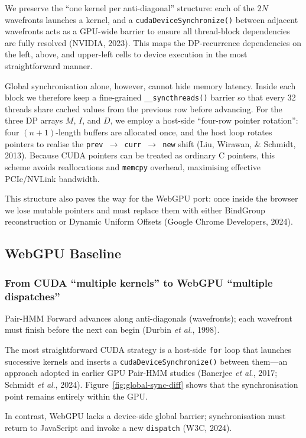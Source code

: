 \documentclass[PhD]{PHlab-thesis}
\begin{document}
We preserve the “one kernel per anti-diagonal” structure: each of the $2N$ wavefronts launches a kernel, and a \texttt{cudaDeviceSynchronize()} between adjacent wavefronts acts as a GPU-wide barrier to ensure all thread-block dependencies are fully resolved (NVIDIA, 2023). This maps the DP-recurrence dependencies on the left, above, and upper-left cells to device execution in the most straightforward manner.

Global synchronisation alone, however, cannot hide memory latency. Inside each block we therefore keep a fine-grained \texttt{\_\_syncthreads()} barrier so that every 32 threads share cached values from the previous row before advancing. For the three DP arrays $M$, $I$, and $D$, we employ a host-side “four-row pointer rotation”: four $(n\!+\!1)$-length buffers are allocated once, and the host loop rotates pointers to realise the \texttt{prev $\rightarrow$ curr $\rightarrow$ new} shift (Liu, Wirawan, \& Schmidt, 2013). Because CUDA pointers can be treated as ordinary C pointers, this scheme avoids reallocations and \texttt{memcpy} overhead, maximising effective PCIe/NVLink bandwidth.

This structure also paves the way for the WebGPU port: once inside the browser we lose mutable pointers and must replace them with either BindGroup reconstruction or Dynamic Uniform Offsets (Google Chrome Developers, 2024).




\subsection{WebGPU Baseline}

\subsubsection{From CUDA “multiple kernels” to WebGPU “multiple dispatches”}
Pair-HMM Forward advances along anti-diagonals (wavefronts); each wavefront must finish before the next can begin (Durbin \emph{et al}., 1998).

The most straightforward CUDA strategy is a host-side \texttt{for} loop that launches successive kernels and inserts a \texttt{cudaDeviceSynchronize()} between them—an approach adopted in earlier GPU Pair-HMM studies (Banerjee \emph{et al}., 2017; Schmidt \emph{et al}., 2024). Figure~\ref{fig:global-sync-diff} shows that the synchronisation point remains entirely within the GPU.

In contrast, WebGPU lacks a device-side global barrier; synchronisation must return to JavaScript and invoke a new \texttt{dispatch} (W3C, 2024).
\end{document}

